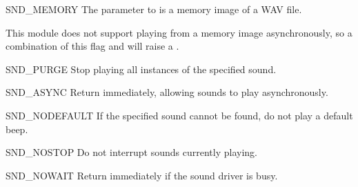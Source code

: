 \begin{datadesc}{SND_MEMORY}
  The  parameter to  is a memory
  image of a WAV file.

    This module does not support playing from a memory
  image asynchronously, so a combination of this flag and
   will raise a .
\end{datadesc}

\begin{datadesc}{SND_PURGE}
  Stop playing all instances of the specified sound.
\end{datadesc}

\begin{datadesc}{SND_ASYNC}
  Return immediately, allowing sounds to play asynchronously.
\end{datadesc}

\begin{datadesc}{SND_NODEFAULT}
  If the specified sound cannot be found, do not play a default beep.
\end{datadesc}

\begin{datadesc}{SND_NOSTOP}
  Do not interrupt sounds currently playing.
\end{datadesc}

\begin{datadesc}{SND_NOWAIT}
  Return immediately if the sound driver is busy.
\end{datadesc}
